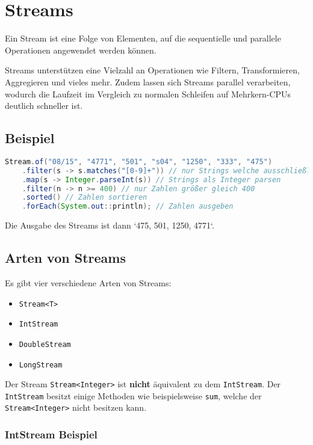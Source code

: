 \chapter{Streams}

Ein Stream ist eine Folge von Elementen, auf die sequentielle und parallele
Operationen angewendet werden können.

Streams unterstützen eine Vielzahl an Operationen wie Filtern, Transformieren,
Aggregieren und vieles mehr. Zudem lassen sich Streams parallel verarbeiten,
wodurch die Laufzeit im Vergleich zu normalen Schleifen auf Mehrkern-CPUs
deutlich schneller ist.

\section{Beispiel}

\begin{lstlisting}[language=Java, caption={Beispiel für Streams}]
Stream.of("08/15", "4771", "501", "s04", "1250", "333", "475")
    .filter(s -> s.matches("[0-9]+")) // nur Strings welche ausschließlich Ziffern enthalten
    .map(s -> Integer.parseInt(s)) // Strings als Integer parsen
    .filter(n -> n >= 400) // nur Zahlen größer gleich 400
    .sorted() // Zahlen sortieren
    .forEach(System.out::println); // Zahlen ausgeben
\end{lstlisting}

Die Ausgabe des Streams ist dann `475, 501, 1250, 4771`.

\section{Arten von Streams}

Es gibt vier verschiedene Arten von Streams:
\begin{itemize}
    \item \texttt{Stream<T>}
    \item \texttt{IntStream}
    \item \texttt{DoubleStream}
    \item \texttt{LongStream}
\end{itemize}

Der Stream \lstinline{Stream<Integer>} ist \textbf{nicht} äquivalent zu dem
\lstinline{IntStream}. Der \lstinline{IntStream} besitzt einige Methoden wie
beispielsweise \lstinline{sum}, welche der \lstinline{Stream<Integer>} nicht
besitzen kann.

\subsection{IntStream Beispiel}

